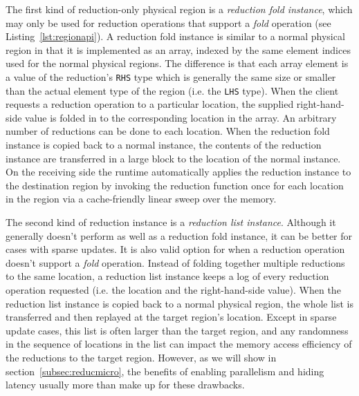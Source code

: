 The first kind of reduction-only physical region is a {\em reduction fold instance}, which may only be
used for reduction operations that support a {\em fold} operation (see Listing~\ref{lst:regionapi}).  
A reduction fold instance is similar
to a normal physical region in that it is implemented as an array, indexed by the same element indices used
for the normal physical regions.  The difference is that each array element is a value of the reduction's
{\tt RHS} type which is generally the same size or smaller than the actual element type of the region 
(i.e. the {\tt LHS} type).  When the client requests a reduction operation to a particular location, 
the supplied right-hand-side value is folded in
to the corresponding location in the array.  An arbitrary number of reductions can be done to each location.
When the reduction fold instance is copied back to a normal instance, the contents of the reduction instance
are transferred in a large block to the location of the normal instance.  On the receiving side
the runtime automatically applies the reduction instance to the destination region
by invoking the reduction function once for each location in the region via a cache-friendly 
linear sweep over the memory.

The second kind of reduction instance is a {\em reduction list instance}.  Although it generally doesn't
perform as well as a reduction fold instance, it can be better for cases with sparse updates.  It is also
valid option for when a reduction operation doesn't support a {\em fold} operation.  Instead of folding
together multiple reductions to the same location, a reduction list instance keeps a log of every
reduction operation requested (i.e. the location and the right-hand-side value).  When the reduction list 
instance is copied back to a normal physical region, the whole list is transferred and then replayed at
the target region's location.  Except in sparse update cases, this list is often larger than the target
region, and any randomness in the sequence of locations in the list can impact the memory access efficiency
of the reductions to the target region.  However, as we will show in section~\ref{subsec:reducmicro}, 
the benefits of enabling parallelism and hiding latency usually more than make up for these drawbacks.

